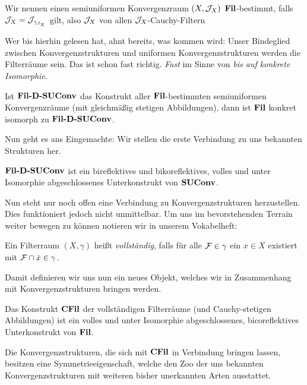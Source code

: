 \begin{defn}
  Wir nennen einen semiuniformen Konvergenzraum $(X, \mathcal{J}_X)$ $\mathbf{Fil}$-bestimmt, falls $\mathcal{J}_X = \mathcal{J}_{\gamma_{J_X}}$ gilt, also $\mathcal{J}_X$ von allen $\mathcal{J}_X$-Cauchy-Filtern
\end{defn}

Wer bis hierhin gelesen hat, ahnt bereits, was kommen wird: Unser Bindeglied zwischen Konvergenzstrukturen und uniformen Konvergenzstrukturen werden die Filterräume sein. Das ist schon fast richtig. \emph{Fast} im Sinne von \emph{bis auf konkrete Isomorphie}.


\begin{prop}
  Ist $\mathbf{Fil\textbf{-}D\textbf{-}SUConv}$ das Konstrukt aller $\mathbf{Fil}$-bestimmten semiuniformen Konvergenzräume (mit gleichmäßig stetigen Abbildungen), dann ist $\mathbf{Fil}$ konkret isomorph zu $\mathbf{Fil\textbf{-}D\textbf{-}SUConv}$.
\end{prop}

Nun geht es ans Eingemachte: Wir stellen die erste Verbindung zu uns bekannten Strukturen her.

\begin{prop}
  $\mathbf{Fil\textbf{-}D\textbf{-}SUConv}$ ist ein bireflektives und bikoreflektives, volles und unter Isomorphie abgeschlossenes Unterkonstrukt von $\mathbf{SUConv}$.
\end{prop}

Nun steht nur noch offen eine Verbindung zu Konvergenzstrukturen herzustellen.
Dies funktioniert jedoch nicht unmittelbar. 
Um uns im bevorstehenden Terrain weiter bewegen zu können notieren wir in unserem Vokabelheft:

\begin{defn}
  Ein Filterraum $(X, \gamma)$ heißt \emph{vollständig}, falls für alle $\mathcal{F} \in \gamma$ ein $x \in X$ existiert mit $\mathcal{F} \cap \dot x \in \gamma$.
\end{defn}

Damit definieren wir uns nun ein neues Objekt, welches wir in Zusammenhang mit Konvergenzstrukturen bringen werden.

\begin{prop}
  Das Konstrukt $\mathbf{CFil}$ der vollständigen Filterräume (und Cauchy-stetigen Abbildungen) ist ein volles und unter Isomorphie abgeschlossenes, bicoreflektives Unterkonstrukt von $\mathbf{Fil}$.
\end{prop}

Die Konvergenzstrukturen, die sich mit $\mathbf{CFil}$ in Verbindung bringen lassen, besitzen eine Symmetrieeigenschaft, welche den Zoo der uns bekannten Konvergenzstrukturen mit weiteren bisher unerkannten Arten ausstattet.

